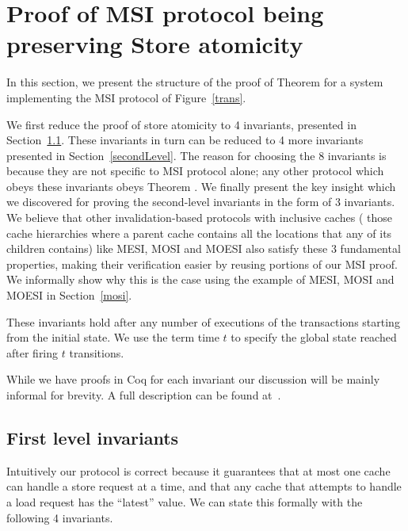\section{Proof of MSI protocol being preserving Store atomicity}
\label{safety}

In this section, we present the structure of the proof of Theorem
 for a system implementing the MSI protocol of
Figure~\ref{trans}.

We first reduce the proof of store atomicity to 4 invariants, presented in
Section~\ref{firstLevel}. These invariants in turn can be reduced to 4 more
invariants presented in Section~\ref{secondLevel}. The reason for choosing the 8
 invariants is because they are not specific to MSI protocol
alone; any other protocol which obeys these invariants obeys Theorem
. We finally present the key insight which we
discovered for proving the second-level invariants in the form of 3 invariants.
We believe that other invalidation-based protocols with inclusive caches (\ie{}
those cache hierarchies where a parent cache contains all the locations that
any of its children contains) like MESI, MOSI and MOESI also
satisfy these 3 fundamental properties, making their verification easier by reusing
portions of our MSI proof.
We informally show why this is the case using the example of MESI,
MOSI and MOESI in Section~\ref{mosi}.


These invariants hold after any number of executions of the transactions starting
from the initial state. We use the term time $t$ to specify the global state
reached after firing $t$ transitions.

While we have proofs in Coq for each invariant our discussion will be mainly
informal for brevity. A full description can be found at~.

\subsection{First level invariants}
\label{firstLevel}
Intuitively our protocol is correct because it guarantees that at most one
cache can handle a store request at a time, and that any cache that attempts to
handle a load request has the ``latest'' value. We can state this formally with
the following 4 invariants.

